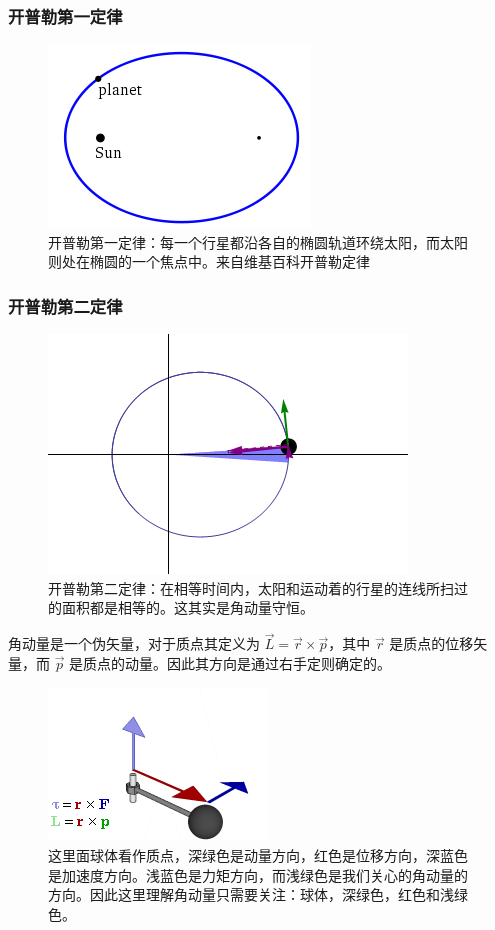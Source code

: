 \documentclass[letterpaper,10pt,english]{sphinxmanual}
\begin{document}
\subsubsection{开普勒第一定律}
\label{orbits:id5}\begin{figure}[htbp]
\centering
\capstart

\includegraphics{Kepler-first-law.png}
\caption{开普勒第一定律：每一个行星都沿各自的椭圆轨道环绕太阳，而太阳则处在椭圆的一个焦点中。来自维基百科开普勒定律}\end{figure}


\subsubsection{开普勒第二定律}
\label{orbits:id6}\begin{figure}[htbp]
\centering
\capstart

\includegraphics{Kepler-second-law.gif}
\caption{开普勒第二定律：在相等时间内，太阳和运动着的行星的连线所扫过的面积都是相等的。这其实是角动量守恒。}\end{figure}

角动量是一个伪矢量，对于质点其定义为 \(\vec L = \vec r \times \vec p\)，其中 \(\vec r\) 是质点的位移矢量，而 \(\vec p\) 是质点的动量。因此其方向是通过右手定则确定的。
\begin{figure}[htbp]
\centering
\capstart

\includegraphics{angular-momentum.gif}
\caption{这里面球体看作质点，深绿色是动量方向，红色是位移方向，深蓝色是加速度方向。浅蓝色是力矩方向，而浅绿色是我们关心的角动量的方向。因此这里理解角动量只需要关注：球体，深绿色，红色和浅绿色。}\end{figure}
\end{document}
